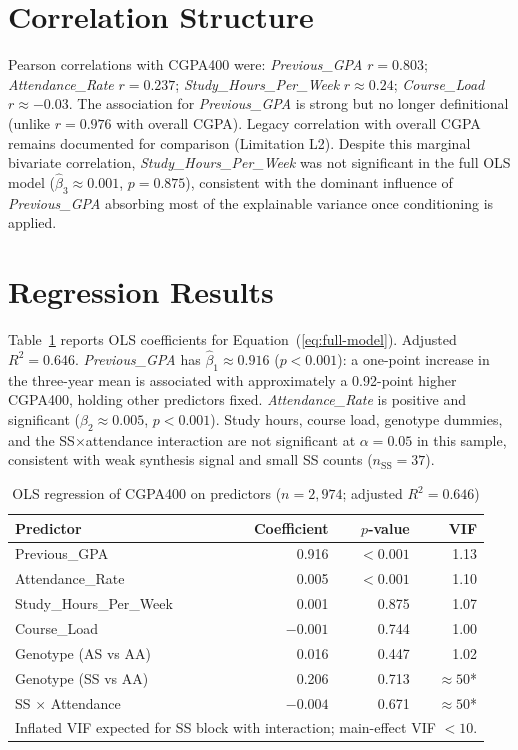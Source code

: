 \documentclass[12pt]{report}
\begin{document}
	\section{Correlation Structure}
	Pearson correlations with CGPA400 were: \textit{Previous\_GPA} $r = 0.803$; \textit{Attendance\_Rate} $r = 0.237$; \textit{Study\_Hours\_Per\_Week} $r \approx 0.24$; \textit{Course\_Load} $r \approx -0.03$. The association for \textit{Previous\_GPA} is strong but no longer definitional (unlike $r = 0.976$ with overall CGPA). Legacy correlation with overall CGPA remains documented for comparison (Limitation L2).
	Despite this marginal bivariate correlation, \textit{Study\_Hours\_Per\_Week}
	was not significant in the full OLS model ($\hat{\beta}_3 \approx 0.001$,
	$p = 0.875$), consistent with the dominant influence of
	\textit{Previous\_GPA} absorbing most of the explainable variance once
	conditioning is applied.
	
	\section{Regression Results}
	Table~\ref{tab:regression} reports OLS coefficients for Equation~(\ref{eq:full-model}). Adjusted $R^2 = 0.646$. \textit{Previous\_GPA} has $\hat{\beta}_1 \approx 0.916$ ($p < 0.001$): a one-point increase in the three-year mean is associated with approximately a 0.92-point higher CGPA400, holding other predictors fixed. \textit{Attendance\_Rate} is positive and significant ($\hat{\beta}_2 \approx 0.005$, $p < 0.001$). Study hours, course load, genotype dummies, and the SS$\times$attendance interaction are not significant at $\alpha = 0.05$ in this sample, consistent with weak synthesis signal and small SS counts ($n_{\text{SS}} = 37$).
	
	\begin{table}[htbp]
		\centering
		\caption{OLS regression of CGPA400 on predictors ($n = 2{,}974$; adjusted $R^2 = 0.646$)}
		\label{tab:regression}
		\begin{tabular}{lrrr}
			\hline
			Predictor & Coefficient & $p$-value & VIF \\
			\hline
			Previous\_GPA & 0.916 & $< 0.001$ & 1.13 \\
			Attendance\_Rate & 0.005 & $< 0.001$ & 1.10 \\
			Study\_Hours\_Per\_Week & 0.001 & 0.875 & 1.07 \\
			Course\_Load & $-0.001$ & 0.744 & 1.00 \\
			Genotype (AS vs AA) & 0.016 & 0.447 & 1.02 \\
			Genotype (SS vs AA) & 0.206 & 0.713 & $\approx 50$* \\
			SS $\times$ Attendance & $-0.004$ & 0.671 & $\approx 50$* \\
			\hline
			\multicolumn{4}{l}{\footnotesize *Inflated VIF expected for SS block with interaction; main-effect VIF $< 10$.}
		\end{tabular}
	\end{table}
	
\end{document}
